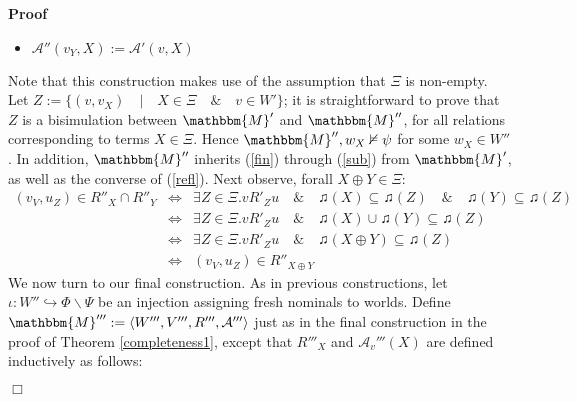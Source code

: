 \documentclass{article}
\newcommand{\assign}{:=}
\newenvironment{itemizedot}{\begin{itemize} \renewcommand{\labelitemi}{$\bullet$}\renewcommand{\labelitemii}{$\bullet$}\renewcommand{\labelitemiii}{$\bullet$}\renewcommand{\labelitemiv}{$\bullet$}}{\end{itemize}}
\newenvironment{proof}{\noindent\textbf{Proof\ }}{\hspace*{\fill}$\Box$\medskip}
\begin{document}
\begin{proof}
\begin{itemizedot}
    \item $\mathcal{A}'' (v_Y, X) \assign \mathcal{A}' (v, X)$
  \end{itemizedot}
  Note that this construction makes use of the assumption that $\Xi$ is
  non-empty.  Let $Z \assign \{(v, v_X) \hspace{1em} | \hspace{1em} X \in \Xi
  \hspace{1em} \& \hspace{1em} v \in W' \}$; it is straightforward to prove
  that $Z$ is a bisimulation between $\mathbbm{M}'$ and $\mathbbm{M}''$, for
  all relations corresponding to terms $X \in \Xi$. Hence $\mathbbm{M}'', w_X
  \nvDash \psi$ for some $w_X \in W''$.  In addition, $\mathbbm{M}''$
  inherits (\ref{fin}) through (\ref{sub}) from $\mathbbm{M}'$, as well as the
  converse of (\ref{refl}).  Next observe, forall $X \oplus Y \in \Xi$:
  \begin{eqnarray*}
    \text{$(v_V, u_Z) \in R''_X \cap R''_Y$} & \Longleftrightarrow & \exists Z
    \in \Xi . \text{$v R'_Z u \hspace{1em} \& \hspace{1em} \twonotes (X)
    \subseteq \twonotes (Z) \hspace{1em} \& \hspace{1em} \twonotes (Y)
    \subseteq \twonotes (Z)$}\\
    & \Longleftrightarrow & \exists Z \in \Xi . \text{$v R'_Z u \hspace{1em}
    \& \hspace{1em} \twonotes (X) \cup \twonotes (Y) \subseteq \twonotes
    (Z)$}\\
    & \Longleftrightarrow & \exists Z \in \Xi . \text{$v R'_Z u \hspace{1em}
    \& \hspace{1em} \twonotes (X \oplus Y) \subseteq \twonotes (Z)$}\\
    & \Longleftrightarrow &  \text{$(v_V, u_Z) \in R''_{X \oplus Y}$}
  \end{eqnarray*}
  We now turn to our final construction. As in previous constructions, let
  $\iota : W'' \hookrightarrow \Phi \backslash \Psi$ be an injection assigning
  fresh nominals to worlds.  Define $\mathbbm{M}''' \assign \langle W''',
  V''', R''', \mathcal{A}''' \rangle$ just as in the final construction in the
  proof of Theorem \ref{completeness1}, except that $R'''_X$ and
  $\mathcal{A}_v''' (X)$ are defined inductively as follows:
  
  
  

\end{proof}
\end{document}
